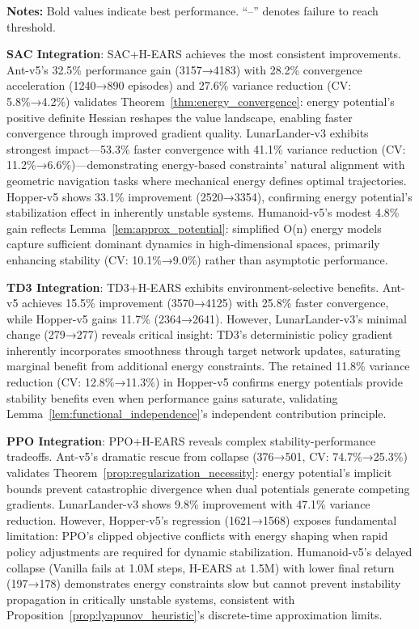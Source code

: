 \documentclass[journal]{IEEEtran}
\begin{document}
\begin{table}[!t]
		\vspace{2mm}
		\footnotesize
		\textbf{Notes:} Bold values indicate best performance. ``--'' denotes failure to reach threshold.
	\end{table}
	
	\textbf{SAC Integration}: SAC+H-EARS achieves the most consistent improvements. Ant-v5's 32.5\% performance gain (3157→4183) with 28.2\% convergence acceleration (1240→890 episodes) and 27.6\% variance reduction (CV: 5.8\%→4.2\%) validates Theorem~\ref{thm:energy_convergence}: energy potential's positive definite Hessian reshapes the value landscape, enabling faster convergence through improved gradient quality. LunarLander-v3 exhibits strongest impact—53.3\% faster convergence with 41.1\% variance reduction (CV: 11.2\%→6.6\%)—demonstrating energy-based constraints' natural alignment with geometric navigation tasks where mechanical energy defines optimal trajectories. Hopper-v5 shows 33.1\% improvement (2520→3354), confirming energy potential's stabilization effect in inherently unstable systems. Humanoid-v5's modest 4.8\% gain reflects Lemma~\ref{lem:approx_potential}: simplified O(n) energy models capture sufficient dominant dynamics in high-dimensional spaces, primarily enhancing stability (CV: 10.1\%→9.0\%) rather than asymptotic performance.
	
	\textbf{TD3 Integration}: TD3+H-EARS exhibits environment-selective benefits. Ant-v5 achieves 15.5\% improvement (3570→4125) with 25.8\% faster convergence, while Hopper-v5 gains 11.7\% (2364→2641). However, LunarLander-v3's minimal change (279→277) reveals critical insight: TD3's deterministic policy gradient inherently incorporates smoothness through target network updates, saturating marginal benefit from additional energy constraints. The retained 11.8\% variance reduction (CV: 12.8\%→11.3\%) in Hopper-v5 confirms energy potentials provide stability benefits even when performance gains saturate, validating Lemma~\ref{lem:functional_independence}'s independent contribution principle.
	
	\textbf{PPO Integration}: PPO+H-EARS reveals complex stability-performance tradeoffs. Ant-v5's dramatic rescue from collapse (376→501, CV: 74.7\%→25.3\%) validates Theorem~\ref{prop:regularization_necessity}: energy potential's implicit bounds prevent catastrophic divergence when dual potentials generate competing gradients. LunarLander-v3 shows 9.8\% improvement with 47.1\% variance reduction. However, Hopper-v5's regression (1621→1568) exposes fundamental limitation: PPO's clipped objective conflicts with energy shaping when rapid policy adjustments are required for dynamic stabilization. Humanoid-v5's delayed collapse (Vanilla fails at 1.0M steps, H-EARS at 1.5M) with lower final return (197→178) demonstrates energy constraints slow but cannot prevent instability propagation in critically unstable systems, consistent with Proposition~\ref{prop:lyapunov_heuristic}'s discrete-time approximation limits.
	
\end{document}
